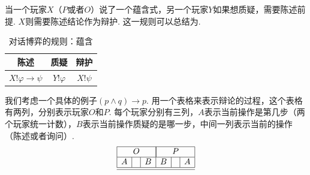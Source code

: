 当一个玩家$X$（$P$或者$O$）说了一个蕴含式，另一个玩家$Y$如果想质疑，需要陈述前提. $X$则需要陈述结论作为辩护. 这一规则可以总结为.
\begin{table}[ht]
    \centering
    \begin{tabular}{c|c|c}
         陈述&质疑&辩护  \\\hline
         $X!\varphi\to\psi$&$Y!\varphi$&$X!\psi$
    \end{tabular}
    \caption{对话博弈的规则：蕴含}
    \label{tab:dialogue-game-impl}
\end{table}

我们考虑一个具体的例子$(p\wedge q)\to p$. 用一个表格来表示辩论的过程，这个表格有两列，分别表示玩家$O$和$P$. 每个玩家分别有三列，$A$表示当前操作是第几步（两个玩家统一计数），$B$表示当前操作质疑的是哪一步，中间一列表示当前的操作（陈述或者询问）.
\[
    \begin{array}{|c|c|c|c|c|c|}
    \hline
        \multicolumn{3}{|c|}{O} & \multicolumn{3}{|c|}{P} \\\hline
        A &  & B & B & & A\\\hline\hline
    \end{array}
\]

